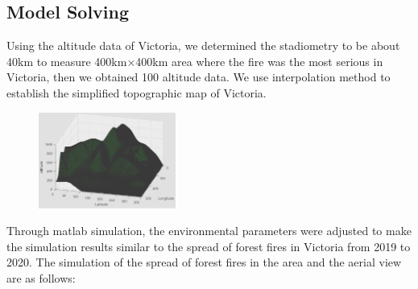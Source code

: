 \documentclass{mcmthesis}
\begin{document}
\subsection{Model Solving}

Using the altitude data of Victoria, we determined the stadiometry to be about 40km to measure 400km×400km area where the fire was the most serious in Victoria, then we obtained 100 altitude data. We use interpolation method to establish the simplified topographic map of Victoria.

\begin{figure}[H]
  \centering
  {
  \includegraphics[width=0.4\textwidth]{image/K.png} 
  }
  \label{png1}
\end{figure}

Through matlab simulation, the environmental parameters were adjusted to make the simulation results similar to the spread of forest fires in Victoria from 2019 to 2020. The simulation of the spread of forest fires in the area and the aerial view are as follows:
\end{document}
